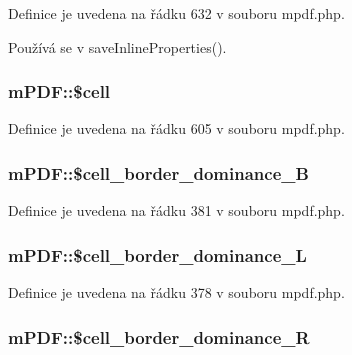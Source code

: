 Definice je uvedena na řádku 632 v souboru mpdf.\-php.



Používá se v save\-Inline\-Properties().

\hypertarget{classm_p_d_f_a9566575d2e1f8ea24734d2fb67fae25a}{
\subsubsection[{\$cell}]{\setlength{\rightskip}{0pt plus 5cm}m\-P\-D\-F\-::\$cell}}\label{classm_p_d_f_a9566575d2e1f8ea24734d2fb67fae25a}


Definice je uvedena na řádku 605 v souboru mpdf.\-php.

\hypertarget{classm_p_d_f_a1d7b7b6e4f6d771717c6b794ffe505d1}{
\subsubsection[{\$cell\-\_\-border\-\_\-dominance\-\_\-\-B}]{\setlength{\rightskip}{0pt plus 5cm}m\-P\-D\-F\-::\$cell\-\_\-border\-\_\-dominance\-\_\-\-B}}\label{classm_p_d_f_a1d7b7b6e4f6d771717c6b794ffe505d1}


Definice je uvedena na řádku 381 v souboru mpdf.\-php.

\hypertarget{classm_p_d_f_a119971113d4bbce717d337f72c0d10f6}{
\subsubsection[{\$cell\-\_\-border\-\_\-dominance\-\_\-\-L}]{\setlength{\rightskip}{0pt plus 5cm}m\-P\-D\-F\-::\$cell\-\_\-border\-\_\-dominance\-\_\-\-L}}\label{classm_p_d_f_a119971113d4bbce717d337f72c0d10f6}


Definice je uvedena na řádku 378 v souboru mpdf.\-php.

\hypertarget{classm_p_d_f_a7ba255757d98b65efdeb752b887adcbb}{
\subsubsection[{\$cell\-\_\-border\-\_\-dominance\-\_\-\-R}]{\setlength{\rightskip}{0pt plus 5cm}m\-P\-D\-F\-::\$cell\-\_\-border\-\_\-dominance\-\_\-\-R}}\label{classm_p_d_f_a7ba255757d98b65efdeb752b887adcbb}


